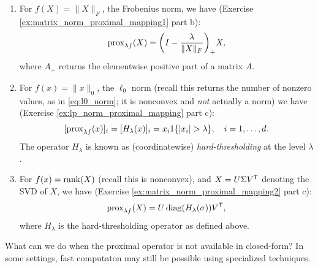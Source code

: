 \begin{Example}
\begin{enumerate}[label=\alph*., ref=\alph*]
\item {}  
  For $f(X) = \|X\|_F$, the Frobenius norm, we have (Exercise
  \ref{ex:matrix_norm_proximal_mapping1} part b):    
  \[
  \operatorname{prox}_{\lambda f}(X) = \bigg(I - \frac{\lambda}{\|X\|_F} \bigg)_+ X,
  \] 
  where $A_+$ returns the elementwise positive part of a matrix $A$. 

\item {}   
  For $f(x) = \|x\|_0$, the $\ell_0$ norm (recall this returns the number of
  nonzero values, as in \eqref{eq:l0_norm}; it is nonconvex and \emph{not}  
  actually a norm) we have (Exercise \ref{ex:lp_norm_proximal_mapping} part c):   
  \[
  [\operatorname{prox}_{\lambda f}(x)]_i = [H_\lambda(x)]_i 
  = x_i 1\{|x_i| > \lambda\}, \quad i = 1,\ldots,d.
  \]  
  The operator $H_\lambda$ is known as (coordinatewise) \emph{hard-thresholding}
  at the level $\lambda$. 

\item {}    
  For $f(x) = \operatorname{rank}(X)$ (recall this is nonconvex), and $X = U \Sigma V^{\mathsf{T}}$
  denoting the SVD of $X$, we have (Exercise
  \ref{ex:matrix_norm_proximal_mapping2} part c):  
  \[
  \operatorname{prox}_{\lambda f}(X) = U \operatorname{diag}(H_\lambda(\sigma)) V^{\mathsf{T}},
  \]
  where $H_\lambda$ is the hard-thresholding operator as defined above.
\end{enumerate}
\end{Example}

What can we do when the proximal operator is not available in closed-form? In
some settings, fast computaton may still be possible using specialized
techniques.  

